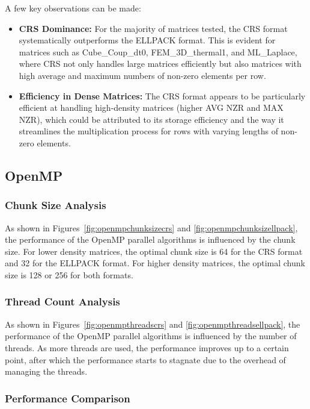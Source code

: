\documentclass[12pt,oneside]{book} %
\begin{document}
A few key observations can be made:
\begin{itemize}
    \item \textbf{CRS Dominance:} For the majority of matrices tested, the CRS format systematically outperforms the ELLPACK format. This is evident for matrices such as Cube\_Coup\_dt0, FEM\_3D\_thermal1, and ML\_Laplace, where CRS not only handles large matrices efficiently but also matrices with high average and maximum numbers of non-zero elements per row.
    \item \textbf{Efficiency in Dense Matrices:} The CRS format appears to be particularly efficient at handling high-density matrices (higher AVG NZR and MAX NZR), which could be attributed to its storage efficiency and the way it streamlines the multiplication process for rows with varying lengths of non-zero elements.
\end{itemize}

\newpage
\subsection{OpenMP}
\subsubsection{Chunk Size Analysis}

As shown in Figures~\ref{fig:openmpchunksizecrs} and
\ref{fig:openmpchunksizellpack}, the performance of the OpenMP parallel
algorithms is influenced by the chunk size. For lower density matrices, the
optimal chunk size is 64 for the CRS format and 32 for the ELLPACK format. For
higher density matrices, the optimal chunk size is 128 or 256 for both formats.

\subsubsection{Thread Count Analysis}

As shown in Figures~\ref{fig:openmpthreadscrs} and
\ref{fig:openmpthreadsellpack}, the performance of the OpenMP parallel
algorithms is influenced by the number of threads. As more threads are used,
the performance improves up to a certain point, after which the performance
starts to stagnate due to the overhead of managing the threads.

\subsubsection{Performance Comparison}
\end{document}

